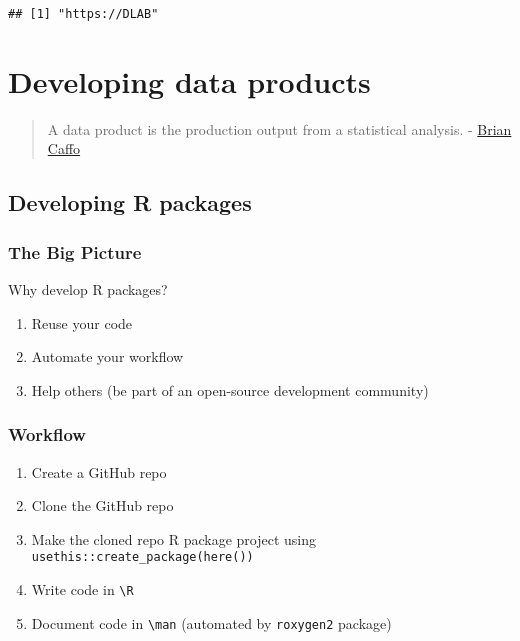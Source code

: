 \documentclass[
]{book}
\providecommand{\tightlist}{%
  \setlength{\itemsep}{0pt}\setlength{\parskip}{0pt}}
\begin{document}
\begin{verbatim}
## [1] "https://DLAB"
\end{verbatim}

\hypertarget{products}{%
\chapter{Developing data products}\label{products}}

\begin{quote}
A data product is the production output from a statistical analysis. - \href{https://sites.google.com/view/bcaffo/home}{Brian Caffo}
\end{quote}

\hypertarget{developing-r-packages}{%
\section{Developing R packages}\label{developing-r-packages}}

\hypertarget{the-big-picture-7}{%
\subsection{The Big Picture}\label{the-big-picture-7}}

Why develop R packages?

\begin{enumerate}
\def\labelenumi{\arabic{enumi}.}
\tightlist
\item
  Reuse your code
\item
  Automate your workflow
\item
  Help others (be part of an open-source development community)
\end{enumerate}

\hypertarget{workflow}{%
\subsection{Workflow}\label{workflow}}

\begin{enumerate}
\def\labelenumi{\arabic{enumi}.}
\tightlist
\item
  Create a GitHub repo
\item
  Clone the GitHub repo
\item
  Make the cloned repo R package project using \texttt{usethis::create\_package(here())}
\item
  Write code in \texttt{\textbackslash{}R}
\item
  Document code in \texttt{\textbackslash{}man} (automated by \texttt{roxygen2} package)
\end{enumerate}
\end{document}
